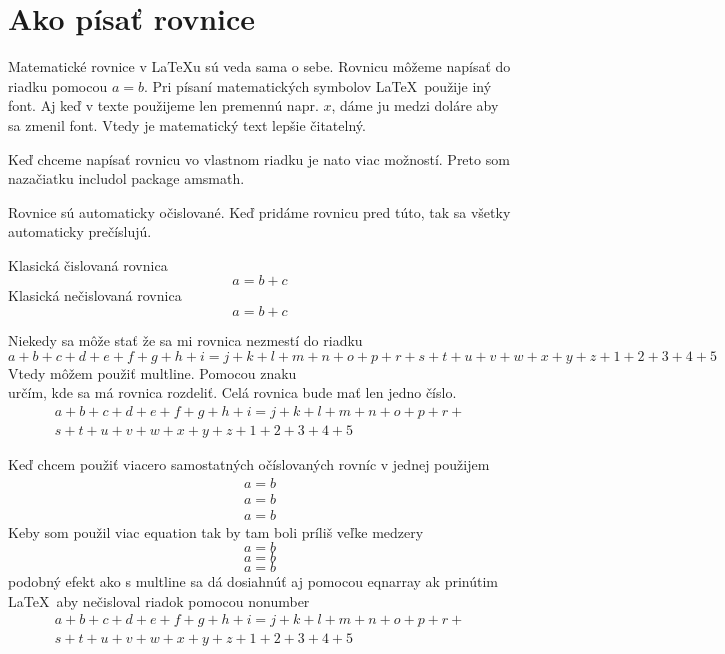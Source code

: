 \documentclass[11pt, a4paper]{article}
\begin{document}
\section{Ako písať rovnice}
Matematické rovnice v \LaTeX u sú veda sama o sebe. Rovnicu môžeme napísať do riadku pomocou $a=b$. Pri písaní matematických symbolov \LaTeX\ použije iný font. Aj keď v texte použijeme len premennú napr. $x$, dáme ju medzi doláre aby sa zmenil font. Vtedy je matematický text lepšie čitatelný.

Keď chceme napísať rovnicu vo vlastnom riadku je nato viac možností. Preto som nazačiatku includol package amsmath.

Rovnice sú automaticky očislované. Keď pridáme rovnicu pred túto, tak sa všetky automaticky prečíslujú. 

Klasická čislovaná rovnica
\begin{equation}
a = b + c
\end{equation}
Klasická nečislovaná rovnica
\begin{equation*}
a = b + c
\end{equation*}

Niekedy sa môže stať že sa mi rovnica nezmestí do riadku
\begin{equation}
a + b + c + d + e + f
+ g + h + i = j + k + l + m + n + o + p + r + s + t + u + v + w + x + y + z + 1 + 2 + 3 + 4 + 5  
\end{equation}
Vtedy môžem použiť multline. Pomocou znaku \\ určím, kde sa má rovnica rozdeliť. Celá rovnica bude mať len jedno číslo.
\begin{multline}
a + b + c + d + e + f
+ g + h + i = j + k + l + m + n + o + p + r + \\
s + t + u + v + w + x + y + z + 1 + 2 + 3 + 4 + 5  
\end{multline}

Keď chcem použiť viacero samostatných očíslovaných rovníc v jednej použijem
\begin{eqnarray}
a = b\\
a = b\\
a = b
\end{eqnarray}
Keby som použil viac equation tak by tam boli príliš veľke medzery
\begin{equation}
a = b
\end{equation}
\begin{equation}
a = b 
\end{equation}
\begin{equation}
a = b
\end{equation}
podobný efekt ako s multline sa dá dosiahnúť aj pomocou eqnarray ak prinútim \LaTeX\ aby nečisloval riadok pomocou nonumber
\begin{eqnarray}
a + b + c + d + e + f
+ g + h + i = j + k + l + m + n + o + p + r + \nonumber \\
s + t + u + v + w + x + y + z + 1 + 2 + 3 + 4 + 5  
\end{eqnarray}
\end{document}
